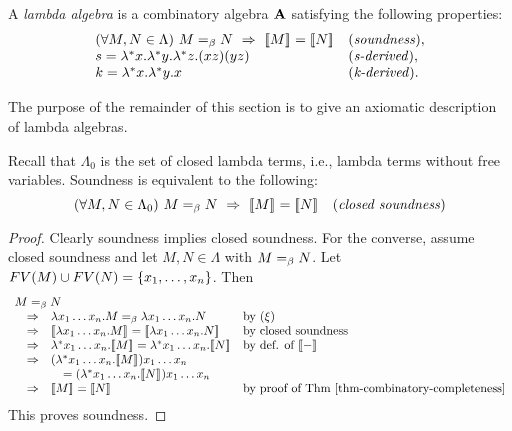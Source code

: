 \documentclass{article}
\begin{document}
\begin{definition}
  A {\em lambda algebra} is a combinatory algebra ${\bf A}$ satisfying the
  following properties: 
  \[\begin{array}{l@{~~~}l}
    (\forall M,N\in\Lambda)\sssep M\eqb N \sssep\imp\sssep \semm{M}=\semm{N}& \trule{soundness},\\
    s = \lam^*x.\lam^*y.\lam^*z.(xz)(yz) &\trule{s-derived},\\
    k = \lam^*x.\lam^*y.x &\trule{k-derived}.\\
  \end{array}
  \]
\end{definition}

The purpose of the remainder of this section is to give an axiomatic
description of lambda algebras.

\begin{lemma}
  Recall that $\Lambda_0$ is the set of closed lambda terms, i.e.,
  lambda terms without free variables. Soundness is equivalent to the
  following:
  \[
  (\forall M,N\in\Lambda_0)\hspace{.35em} M=_{\beta} N \hspace{.35em}\Rightarrow\hspace{.35em} [\![M]\!]_{}=[\![N]\!]_{}
  \hspace{1em}\textrm{(\textit{closed soundness\/})}
  \]
\end{lemma}

\begin{proof}
  Clearly soundness implies closed soundness. For the converse, assume
  closed soundness and let $M,N\in\Lambda$ with $M=_{\beta} N$. Let
  $FV(M)\cup FV(N)=\{x_1,\ldots,x_n\}$.  Then
  \[ \begin{array}{llll}
    \multicolumn{3}{l}{M\eqb N} \\
    &\imp& \lam x_1\ldots x_n.M\eqb \lam x_1\ldots x_n.N & \mbox{by $\nrule{\xi}$} \\
    &\imp& \semm{\lam x_1\ldots x_n.M}=\semm{\lam x_1\ldots x_n.N} & \mbox{by closed soundness} \\
    &\imp& \lam^* x_1\ldots x_n.\semm{M} = \lam^* x_1\ldots x_n.\semm{N} & \mbox{by def. of $\semm{-}$} \\
    &\imp& (\lam^* x_1\ldots x_n.\semm{M})x_1\ldots x_n \\
    &&  \ssep= (\lam^* x_1\ldots x_n.\semm{N})x_1\ldots x_n \\
    &\imp& \semm{M}=\semm{N} &\mbox{by proof of Thm~\ref{thm-combinatory-completeness}}
  \end{array}
  \]
  This proves soundness.\eot
\end{proof}
\end{document}
